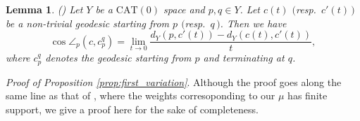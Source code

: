 \documentclass[12pt]{amsart}
\numberwithin{equation}{section}
\theoremstyle{plain}
\newtheorem{Lemma}[Theorem]{Lemma}
\theoremstyle{definition}
\theoremstyle{remark}
\newcommand{\cat}[1]{\mathrm{CAT}(#1)}
\newcommand{\cc}[2]{c_{#1}^{#2}}
\begin{document}
\begin{Lemma}{{\rm (\cite[Lemma 1.4]{izeki-nayatani})}}
\label{lem:angle2}
 Let $Y$ be a $\cat{0}$ space and $p,q \in Y$.  Let $c(t)$
 $($resp.~$c'(t)$\,$)$ be a non-trivial geodesic starting from $p$
 $($resp.~$q$\,$)$. Then we have
 \begin{equation*}
  \cos \angle_p(c,\cc{p}{q}) = \lim_{t\rightarrow 0} 
       \frac{ d_Y(p,c'(t))-d_Y(c(t),c'(t))}{t}, 
 \end{equation*}
 where $\cc{p}{q}$ denotes the geodesic starting from $p$ and
 terminating at $q$. 
\end{Lemma}

%
%
\noindent
{\it Proof of Proposition \ref{prop:first_variation}}.
 Although the proof goes along the same line as that of 
 \cite[Proposition 2.5]{izeki-nayatani}, where the weights
 corresoponding to our $\mu$ has finite support, we give a proof here
 for the sake of completeness. 
 
\end{document}
